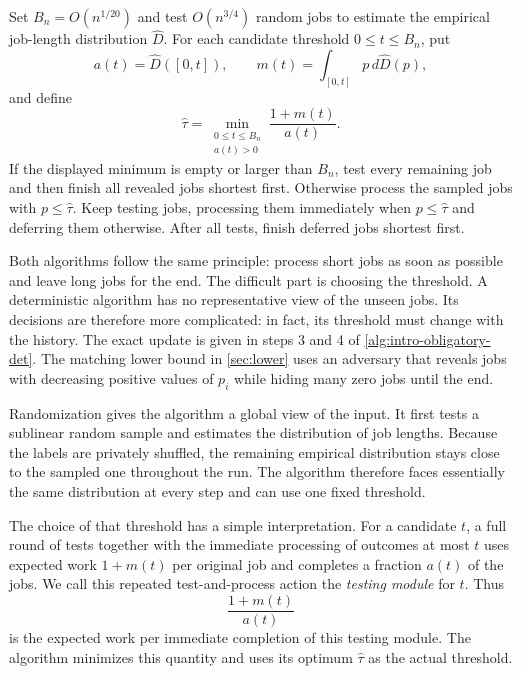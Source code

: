 \begin{algorithm}[H]
\caption{}
\label{alg:intro-obligatory-rand}
\begin{algorithmic}
\State Set $B_n=O(n^{1/20})$ and test $O(n^{3/4})$ random jobs to estimate
the empirical job-length distribution $\widehat D$.
\State For each candidate threshold $0\le t\le B_n$, put
\[
 a(t)=\widehat D([0,t]),\qquad
 m(t)=\int_{[0,t]}p\,d\widehat D(p),
\]
and define
\[
 \widehat\tau
 =\min_{\substack{0\le t\le B_n\\a(t)>0}}
   \frac{1+m(t)}{a(t)}.
\]
\State If the displayed minimum is empty or larger than $B_n$, test every
remaining job and then finish all revealed jobs shortest first.
\State Otherwise process the sampled jobs with $p\le\widehat\tau$.  Keep
testing jobs, processing them immediately when $p\le\widehat\tau$ and
deferring them otherwise.
\State After all tests, finish deferred jobs shortest first.
\end{algorithmic}
\end{algorithm}

Both algorithms follow the same principle: process short jobs as soon as
possible and leave long jobs for the end.  The difficult part is choosing the
threshold.  A deterministic algorithm has no representative view of the
unseen jobs.  Its decisions are therefore more complicated: in fact, its
threshold must change with the history.  The exact update is given in
steps 3 and 4 of \cref{alg:intro-obligatory-det}.  The matching lower bound
in \cref{sec:lower} uses an adversary that reveals jobs with decreasing
positive values of $p_i$ while hiding many zero jobs until the end.

Randomization gives the algorithm a global view of the input.  It first tests
a sublinear random sample and estimates the distribution of job lengths.
Because the labels are privately shuffled, the remaining empirical
distribution stays close to the sampled one throughout the run.  The
algorithm therefore faces essentially the same distribution at every step
and can use one fixed threshold.


The choice of that threshold has a simple interpretation.  For a candidate
$t$, a full round of tests together with the immediate processing of outcomes
at most $t$ uses expected work $1+m(t)$ per original job and completes a fraction
$a(t)$ of the jobs.  We call this repeated test-and-process action the
\emph{testing module} for $t$.  Thus
\[
 \frac{1+m(t)}{a(t)}
\]
is the expected work per immediate completion of this testing module.
The algorithm minimizes this quantity and uses its optimum
$\widehat\tau$ as the actual threshold.

